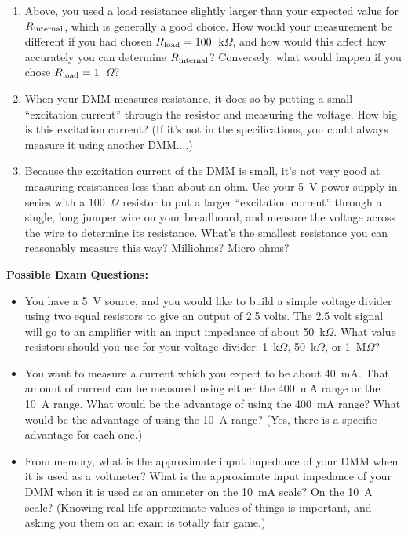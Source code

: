 \begin{enumerate}[wide]
\item Above, you used a load resistance slightly larger than your expected value for $R_{\rm internal}$, which is generally a good choice.  How would your measurement be different if you had chosen  $R_{\rm load} = 100$~k$\Omega$, and how  would this affect how accurately you can determine $R_{\rm internal}$?  Conversely, what would happen if you chose $R_{\rm load} = 1$~$\Omega$?  

\item When your DMM measures resistance, it does so by putting a small ``excitation current'' through the resistor and measuring the voltage.  How big is this excitation current?   (If it's not in the specifications, you could always measure it using another DMM....) 

\item Because the excitation current of the DMM is small, it's not very good at measuring resistances less than about an ohm.  Use your 5~V power supply in series with a 100~$\Omega$ resistor to put a larger ``excitation current'' through a single, long jumper wire on your breadboard, and measure the voltage across the wire to determine its resistance.  What's the smallest resistance you can reasonably measure this way?  Milliohms?  Micro ohms?  

\end{enumerate}


\textbf{Possible Exam Questions:}

\begin{itemize}
\item You have a 5~V source, and you would like to build a simple voltage divider using two equal resistors to give an output of 2.5 volts.  The 2.5 volt signal will go to an amplifier with an input impedance of about 50~k$\Omega$.  What value resistors should you use for your voltage divider: 1~k$\Omega$, 50~k$\Omega$, or 1~M$\Omega$?

\item You want to measure a current which you expect to be about 40~mA.  That amount of current can be measured using either the 400~mA range or the 10~A range.  What would be the advantage of using the 400~mA range?  What would be the advantage of using the 10~A range? (Yes, there is a specific advantage for each one.)  

\item From memory, what is the approximate input impedance of your DMM when it is used as a voltmeter?  What is the approximate input impedance of your DMM when it is used as an ammeter on the 10~mA scale?  On the 10~A scale?  (Knowing real-life approximate values of things is important, and asking you them on an exam is totally fair game.)
\end{itemize}




